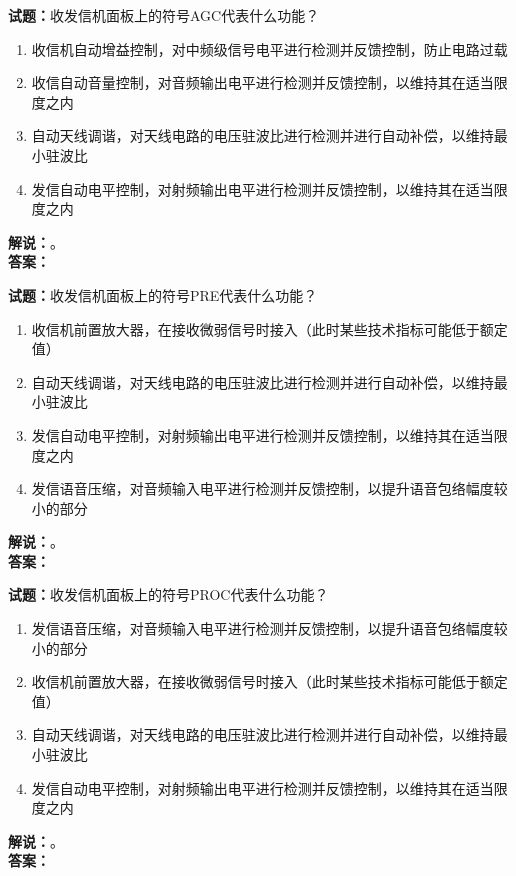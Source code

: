 \documentclass{ctexbook}
\begin{document}
\bigskip




\noindent\textbf{试题：}收发信机面板上的符号AGC代表什么功能？
\begin{enumerate}[leftmargin=3em]
\item 收信机自动增益控制，对中频级信号电平进行检测并反馈控制，防止电路过载
\item 收信自动音量控制，对音频输出电平进行检测并反馈控制，以维持其在适当限度之内
\item 自动天线调谐，对天线电路的电压驻波比进行检测并进行自动补偿，以维持最小驻波比
\item 发信自动电平控制，对射频输出电平进行检测并反馈控制，以维持其在适当限度之内
\end{enumerate}
\noindent\textbf{解说：}\textbf{}。\\\noindent\textbf{答案：}

\bigskip




\noindent\textbf{试题：}收发信机面板上的符号PRE代表什么功能？
\begin{enumerate}[leftmargin=3em]
\item 收信机前置放大器，在接收微弱信号时接入（此时某些技术指标可能低于额定值）
\item 自动天线调谐，对天线电路的电压驻波比进行检测并进行自动补偿，以维持最小驻波比
\item 发信自动电平控制，对射频输出电平进行检测并反馈控制，以维持其在适当限度之内
\item 发信语音压缩，对音频输入电平进行检测并反馈控制，以提升语音包络幅度较小的部分
\end{enumerate}
\noindent\textbf{解说：}\textbf{}。\\\noindent\textbf{答案：}

\bigskip




\noindent\textbf{试题：}收发信机面板上的符号PROC代表什么功能？
\begin{enumerate}[leftmargin=3em]
\item 发信语音压缩，对音频输入电平进行检测并反馈控制，以提升语音包络幅度较小的部分
\item 收信机前置放大器，在接收微弱信号时接入（此时某些技术指标可能低于额定值）
\item 自动天线调谐，对天线电路的电压驻波比进行检测并进行自动补偿，以维持最小驻波比
\item 发信自动电平控制，对射频输出电平进行检测并反馈控制，以维持其在适当限度之内
\end{enumerate}
\noindent\textbf{解说：}\textbf{}。\\\noindent\textbf{答案：}
\end{document}
